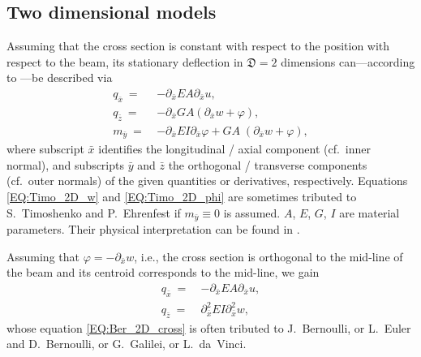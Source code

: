\documentclass[a4paper, english, 12pt, reqno, draft]{amsart}
\theoremstyle{definition}
\theoremstyle{remark}
\numberwithin{equation}{section}
\newcommand{\globDim}{\ensuremath{\mathfrak D}}
\newcommand{\longDef}{\ensuremath{u}}
\newcommand{\crossDef}{\ensuremath{w}}
\newcommand{\torsion}{\ensuremath{\varphi}}
\newcommand{\force}{\ensuremath{q}}
\newcommand{\momentum}{\ensuremath{m}}
\begin{document}
\subsection{Two dimensional models}\label{SEC:2d_Ber}
% 
Assuming that the cross section is constant with respect to the position with respect to the beam, its stationary deflection in $\globDim = 2$ dimensions can---according to \cite[Sect.\ 1.4.3]{MeskourisH2013}---be described via
% 
\begin{subequations}\label{EQ:Timo_2D}
 \begin{align}
  \force_{\bar x} ~=~ & - \partial_{\bar x} EA \partial_{\bar x} \longDef, \label{EQ:beam_long_Timo}\\
  \force_{\bar z} ~=~ & - \partial_{\bar x} GA ( \partial_{\bar x} \crossDef + \torsion ), \label{EQ:Timo_2D_w}\\
  \momentum_{\bar y} ~=~ & - \partial_{\bar x} EI \partial_{\bar x} \torsion + GA \; ( \partial_{\bar x} \crossDef + \torsion ), \label{EQ:Timo_2D_phi}
 \end{align}
\end{subequations}
% 
where subscript $\bar x$ identifies the longitudinal / axial component (cf.\ inner normal), and subscripts $\bar y$ and $\bar z$ the orthogonal / transverse components (cf.\ outer normals) of the given quantities or derivatives, respectively. Equations  \eqref{EQ:Timo_2D_w} and \eqref{EQ:Timo_2D_phi} are sometimes tributed to S.\ Timoshenko and P.\ Ehrenfest if $\momentum_{\bar y} \equiv 0$ is assumed. $A$, $E$, $G$, $I$ are material parameters. Their physical interpretation can be found in \cite[Sect.\ 1.3.3]{MeskourisH2013}.

Assuming that $\torsion = - \partial_{\bar x} \crossDef$, i.e., the cross section is orthogonal to the mid-line of the beam and its centroid corresponds to the mid-line, we gain
% 
\begin{subequations}\label{EQ:Ber_2D}
 \begin{align}
  \force_{\bar x} ~=~ & - \partial_{\bar x}  EA \partial_{\bar x} \longDef, \label{EQ:beam_long_Ber}\\
  \force_{\bar z} ~=~ & \partial_{\bar x}^2 EI \partial_{\bar x}^2 \crossDef, \label{EQ:Ber_2D_cross}
 \end{align}
\end{subequations}
% 
whose equation \eqref{EQ:Ber_2D_cross} is often tributed to J.\ Bernoulli, or  L.\ Euler and D.\ Bernoulli, or G.\ Galilei, or L.\ da~Vinci.
% 
\end{document}
